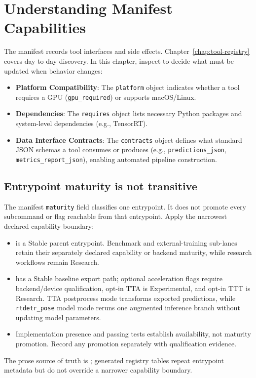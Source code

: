 \section{Understanding Manifest Capabilities}
The manifest records tool interfaces and side effects. Chapter~\ref{chap:tool-registry} covers day-to-day discovery. In this chapter, inspect  to decide what must be updated when behavior changes:
\begin{itemize}
  \item \textbf{Platform Compatibility}: The \texttt{platform} object indicates whether a tool requires a GPU (\texttt{gpu\_required}) or supports macOS/Linux.
  \item \textbf{Dependencies}: The \texttt{requires} object lists necessary Python packages and system-level dependencies (e.g., TensorRT).
  \item \textbf{Data Interface Contracts}: The \texttt{contracts} object defines what standard JSON schemas a tool consumes or produces (e.g., \texttt{predictions\_json}, \texttt{metrics\_report\_json}), enabling automated pipeline construction.
\end{itemize}

\subsection{Entrypoint maturity is not transitive}
The manifest \texttt{maturity} field classifies one entrypoint. It does not
promote every subcommand or flag reachable from that entrypoint. Apply the
narrowest declared capability boundary:
\begin{itemize}
  \item {} is a Stable parent entrypoint. Benchmark and
  external-training sub-lanes retain their separately declared capability or
  backend maturity, while research workflows remain Research.
  \item {} has a Stable baseline export path;
  optional acceleration flags require backend/device qualification, opt-in TTA
  is Experimental, and opt-in TTT is Research. TTA postprocess mode transforms
  exported predictions, while \texttt{rtdetr\_pose} model mode reruns one
  augmented inference branch without updating model parameters.\par
  \item Implementation presence and passing tests establish availability, not
  maturity promotion. Record any promotion separately with qualification
  evidence.
\end{itemize}
The prose source of truth is ; generated
registry tables repeat entrypoint metadata but do not override a narrower
capability boundary.

